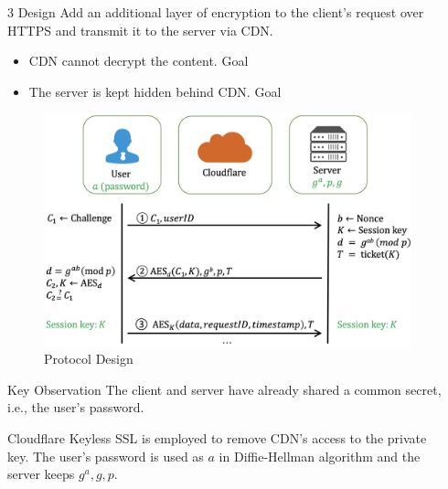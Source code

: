 \documentclass[final]{beamer}
\newlength{\sepwid}
\newlength{\onecolwid}
\newcommand{\vtopsep}[0]{\vspace{0.2ex}}
\newcommand*\circled[1]{\tikz[baseline=(char.base)]{
			\node[shape=circle,draw,inner sep=2pt] (char) {#1};}}
\begin{document}
\begin{frame}[t]
\begin{columns}[t]
\begin{column}{\onecolwid}
\begin{block}{3 Design}
				Add an additional layer of encryption to the client's request over HTTPS and transmit it to the server via CDN.
				\vtopsep
				\begin{itemize}
					\item CDN cannot decrypt the content. Goal~\circled{1} \checkmark %
					\item The server is kept hidden behind CDN. Goal~\circled{2} \checkmark
				\end{itemize}
				\begin{figure}
					\includegraphics[width=\linewidth]{figures/solution.png}
					\caption{Protocol Design}
				\end{figure}
				\begin{alertblock}{Key Observation}
					The client and server have already shared a common secret, i.e., the user's password.
				\end{alertblock}
				Cloudflare Keyless SSL is employed to remove CDN's access to the private key. The user's password is used as $a$ in Diffie-Hellman algorithm and the server keeps $g^a, g, p$.
			\end{block}
		\end{column} %
																																		        
		\begin{column}{\sepwid}\end{column} %
												

\end{columns}
\end{frame}
\end{document}
